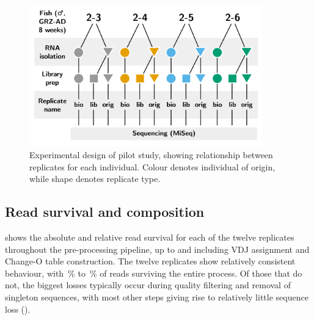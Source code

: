 \begin{figure}
\centering
\includegraphics[width = 0.9\textwidth]{_Figures/png_edited/igseq-pilot-design_wide.png}
\caption{Experimental design of pilot study, showing relationship between replicates for each individual. Colour denotes individual of origin, while shape denotes replicate type.}
\label{fig:igseq-pilot-design}
\end{figure}

\subsection{Read survival and composition}
\label{sec:igseq_pilot_composition}

 shows the absolute and relative read survival for each of the twelve replicates throughout the pre-processing pipeline, up to and including VDJ assignment and Change-O table construction. The twelve replicates show relatively consistent behaviour, with \,\% to \,\% of reads surviving the entire process. Of those that do not, the biggest losses typically occur during quality filtering and removal of singleton sequences, with most other steps giving rise to relatively little sequence loss ().

